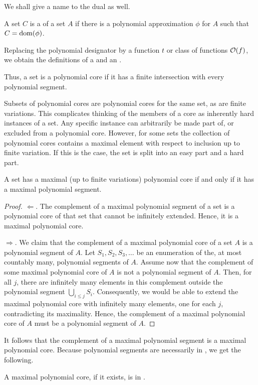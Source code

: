 We shall give a name to the dual as well.
\begin{definition}
  A set $C$ is a  of a set $A$ if there is a polynomial approximation $\phi$ for $A$ such that $C = \operatorname{dom}(\phi)$.

  Replacing the polynomial designator by a function $t$ or class of functions $\operatorname{\mathcal{O}}(f)$, we obtain the definitions of a  and an .
\end{definition}
Thus, a set is a polynomial core if it has a finite intersection with every polynomial segment.

Subsets of polynomial cores are polynomial cores for the same set, as are finite variations.
This complicates thinking of the members of a core as inherently hard instances of a set.
Any specific instance can arbitrarily be made part of, or excluded from a polynomial core.
However, for some sets the collection of polynomial cores contains a maximal element with respect to inclusion up to finite variation.
If this is the case, the set is split into an easy part and a hard part.
\begin{theorem}
\label{thm:maximal}
  A set has a maximal (up to finite variations) polynomial core if and only if it has a maximal polynomial segment.
\end{theorem}
\begin{proof}
  $\Longleftarrow$.
  The complement of a maximal polynomial segment of a set is a polynomial core of that set that cannot be infinitely extended.
  Hence, it is a maximal polynomial core.

  $\Longrightarrow$.
  We claim that the complement of a maximal polynomial core of a set $A$ is a polynomial segment of $A$.
  Let $S_1, S_2, S_3, \ldots$ be an enumeration of the, at most countably many, polynomial segments of $A$.
  Assume now that the complement of some maximal polynomial core of $A$ is not a polynomial segment of $A$.
  Then, for all $j$, there are infinitely many elements in this complement outside the polynomial segment $\bigcup_{i \le j} S_i$.
  Consequently, we would be able to extend the maximal polynomial core with infinitely many elements, one for each $j$, contradicting its maximality.
  Hence, the complement of a maximal polynomial core of $A$ must be a polynomial segment of $A$.
\end{proof}

It follows that the complement of a maximal polynomial segment is a maximal polynomial core.
Because polynomial segments are necessarily in , we get the following.
\begin{corollary}
  A maximal polynomial core, if it exists, is in .
\end{corollary}

